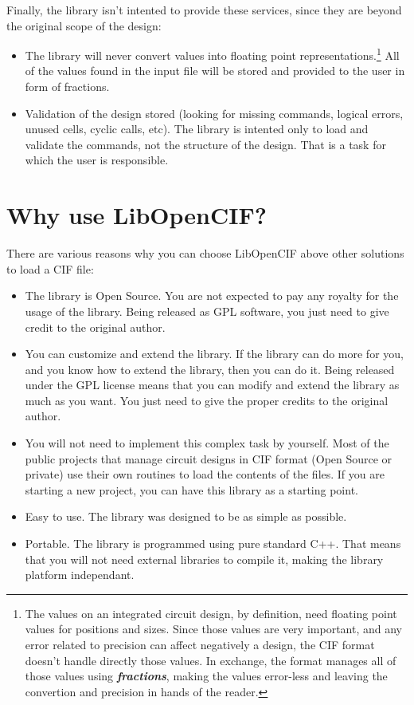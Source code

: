 \documentclass[11pt,twoside,openany,x11names,svgnames]{memoir}
\begin{document}
Finally, the library isn't intented to provide these services, since they are beyond the original scope of the design:

\begin{itemize}
	\item The library will never convert values into floating point representations.\footnote{The values on an integrated circuit design, by definition, need floating point values for positions and sizes. Since those values are very important, and any error related to precision can affect negatively a design, the CIF format doesn't handle directly those values. In exchange, the format manages all of those values using \textbf{\textit{fractions}}, making the values error-less and leaving the convertion and precision in hands of the reader.} All of the values found in the input file will be stored and provided to the user in form of fractions.
	\item Validation of the design stored (looking for missing commands, logical errors, unused cells, cyclic calls, etc). The library is intented only to load and validate the commands, not the structure of the design. That is a task for which the user is responsible.
\end{itemize}

\section{Why use LibOpenCIF?}\label{Why-use-LibOpenCIF}

There are various reasons why you can choose LibOpenCIF above other solutions to load a CIF file:

\begin{itemize}
	\item The library is Open Source. You are not expected to pay any royalty for the usage of the library. Being released as GPL software, you just need to give credit to the original author.
	\item You can customize and extend the library. If the library can do more for you, and you know how to extend the library, then you can do it. Being released under the GPL license means that you can modify and extend the library as much as you want. You just need to give the proper credits to the original author.
	\item You will not need to implement this complex task by yourself. Most of the public projects that manage circuit designs in CIF format (Open Source or private) use their own routines to load the contents of the files. If you are starting a new project, you can have this library as a starting point.
	\item Easy to use. The library was designed to be as simple as possible.
	\item Portable. The library is programmed using pure standard C++. That means that you will not need external libraries to compile it, making the library platform independant.
\end{itemize}
\end{document}
